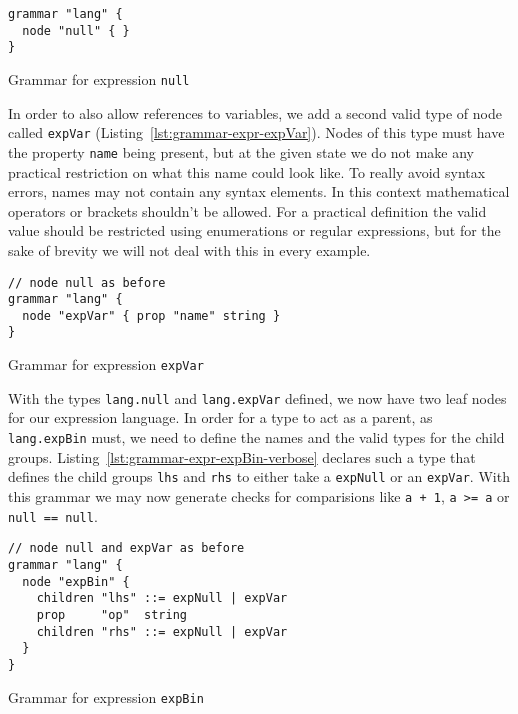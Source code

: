 \documentclass[sigconf,natbib=false,review=true,anonymous]{acmart}
\begin{document}
\begin{listing}[H]
\begin{verbatim}
grammar "lang" {
  node "null" { }
}
\end{verbatim}
\caption{Grammar for expression \texttt{null}}
\label{lst:grammar-expr-null}
\end{listing}

In order to also allow references to variables, we add a second valid type of node called \texttt{expVar} (Listing~\ref{lst:grammar-expr-expVar}). Nodes of this type must have the property \texttt{name} being present, but at the given state we do not make any practical restriction on what this name could look like. To really avoid syntax errors, names may not contain any syntax elements. In this context mathematical operators or brackets shouldn't be allowed. For a practical definition the valid value should be restricted using enumerations or regular expressions, but for the sake of brevity we will not deal with this in every example.

\begin{listing}[H]
\begin{verbatim}
// node null as before
grammar "lang" {
  node "expVar" { prop "name" string }
}
\end{verbatim}
\caption{Grammar for expression \texttt{expVar}}
\label{lst:grammar-expr-expVar}
\end{listing}

With the types \texttt{lang.null} and \texttt{lang.expVar} defined, we now have two leaf nodes for our expression language. In order for a type to act as a parent, as \texttt{lang.expBin} must, we need to define the names and the valid types for the child groups. Listing~\ref{lst:grammar-expr-expBin-verbose} declares such a type that defines the child groups \texttt{lhs} and \texttt{rhs} to either take a \texttt{expNull} or an \texttt{expVar}. With this grammar we may now generate checks for comparisions like \texttt{a + 1}, \texttt{a >= a} or \texttt{null == null}.

\begin{listing}[H]
\begin{verbatim}
// node null and expVar as before
grammar "lang" {
  node "expBin" {
    children "lhs" ::= expNull | expVar
    prop     "op"  string
    children "rhs" ::= expNull | expVar
  }
}
\end{verbatim}
\caption{Grammar for expression \texttt{expBin}}
\label{lst:grammar-expr-expBin-verbose}
\end{listing}
\end{document}
